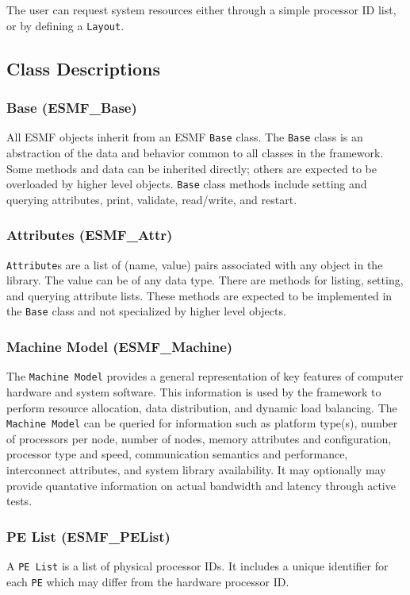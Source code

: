 The user can request system resources either through a simple processor
ID list, or by defining a {\tt Layout}.

\subsection{Class Descriptions}

\subsubsection{Base (ESMF\_Base)}
\label{sec:Base} 
All ESMF objects inherit from an ESMF {\tt Base} class.  
The {\tt Base} class is an abstraction of the data and behavior common to all
classes in the framework.  Some methods and data can be
inherited directly; others are expected to be overloaded by
higher level objects.  {\tt Base} class methods include setting and querying 
attributes, print, validate, read/write, and restart. 

\subsubsection{Attributes (ESMF\_Attr)}
\label{sec:Attr}
{\tt Attribute}s are a list of (name, value) pairs associated with any 
object in the library. The value can be of any data type. 
There are methods for listing, setting, and querying attribute lists.
These methods are expected to be implemented in the {\tt Base} class
and not specialized by higher level objects.

\subsubsection{Machine Model (ESMF\_Machine)} 
\label{sec:machine} 
The {\tt Machine Model} provides a general representation of 
key features of computer hardware and system software.  
This information is used by the framework to 
perform resource allocation, data distribution, and dynamic load balancing.  
The {\tt Machine Model} can be queried for information such as
platform type(s), number of processors per node, number of nodes, 
memory attributes and configuration, processor type and speed,
communication semantics and performance, 
interconnect attributes, and system library availability.
It may optionally may provide quantative information 
on actual bandwidth and latency through active tests.  

\subsubsection{PE List (ESMF\_PEList)}
\label{sec:pelist} 
A {\tt PE List} is a list of physical processor IDs.  It includes a 
unique identifier for each {\tt PE} which may differ from the hardware 
processor ID.  

